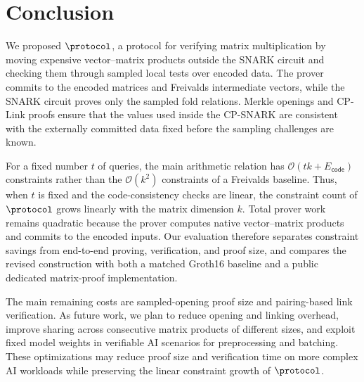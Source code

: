 \section{Conclusion}
\label{sec:conclusion}

We proposed \(\protocol\), a protocol for verifying matrix multiplication by
moving expensive vector--matrix products outside the SNARK circuit and checking
them through sampled local tests over encoded data.  The prover commits to the
encoded matrices and Freivalds intermediate vectors, while the SNARK circuit
proves only the sampled fold relations.  Merkle openings and CP-Link proofs
ensure that the values used inside the CP-SNARK are consistent with the
externally committed data fixed before the sampling challenges are known.

For a fixed number \(t\) of queries, the main arithmetic relation has
\(\mathcal{O}(tk+E_{\mathsf{code}})\) constraints rather than the
\(\mathcal{O}(k^2)\) constraints of a Freivalds baseline.  Thus, when \(t\) is
fixed and the code-consistency checks are linear, the constraint count of
\(\protocol\) grows linearly with the matrix dimension \(k\).  Total prover
work remains quadratic because the prover computes native vector--matrix
products and commits to the encoded inputs.  Our evaluation therefore
separates constraint savings from end-to-end proving, verification, and proof
size, and compares the revised construction with both a matched Groth16
baseline and a public dedicated matrix-proof implementation.

The main remaining costs are sampled-opening proof size and pairing-based link
verification.  As future work, we plan to reduce opening and linking overhead,
improve sharing across consecutive matrix products of different sizes, and
exploit fixed model weights in verifiable AI scenarios for preprocessing and
batching.  These optimizations may reduce proof size and verification time on
more complex AI workloads while preserving the linear constraint growth of
\(\protocol\).


\newpage
